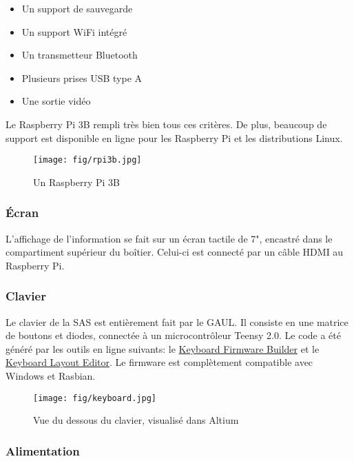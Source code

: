 \begin{itemize}
	\item Un support de sauvegarde
	\item Un support WiFi intégré
	\item Un transmetteur Bluetooth
	\item Plusieurs prises USB type A
	\item Une sortie vidéo
\end{itemize}

Le Raspberry Pi 3B rempli très bien tous ces critères. De plus, beaucoup de
support est disponible en ligne pour les Raspberry Pi et les distributions
Linux.

\begin{figure}[H]
	\center
	\texttt{[image: fig/rpi3b.jpg]}
	\caption{Un Raspberry Pi 3B}
	\label{f:rpi3b}
\end{figure}

\subsubsection{Écran}

L'affichage de l'information se fait sur un écran tactile de 7", encastré dans
le compartiment supérieur du boîtier. Celui-ci est connecté par un câble HDMI au
Raspberry Pi.

\subsubsection{Clavier}

Le clavier de la SAS est entièrement fait par le GAUL. Il consiste en une
matrice de boutons et diodes, connectée à un microcontrôleur Teensy 2.0. Le
code a été généré par les outils en ligne suivants: le
\href{http://kbfirmware.com/}{Keyboard Firmware Builder} et le
\href{http://www.keyboard-layout-editor.com/}{Keyboard Layout Editor}. Le
firmware est complètement compatible avec Windows et Rasbian.

\begin{figure}[H]
	\center
	\texttt{[image: fig/keyboard.jpg]}
	\caption{Vue du dessous du clavier, visualisé dans Altium}
	\label{f:keyboard}
\end{figure}

\subsubsection{Alimentation}

